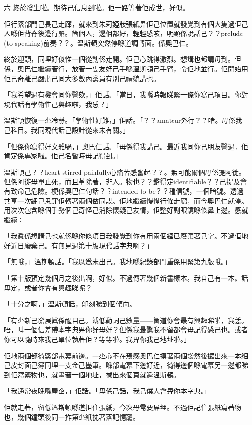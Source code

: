 六
終於發生啦。期待己信息到啦。佢一路等著佢成世，好似。

佢行緊部門己長己走廊，就來到朱莉婭𤗈張紙畀佢己位置就發覺到有個大隻過佢己人喺佢背脊後邊行緊。箇個人，邊個都好，輕輕感咳，明顯係說話己？？prelude (to speaking)前奏？？。溫斯頓突然停喺道調轉面。係奧巴仁。

終於迎頭，同埋好似惟一個從動係走開。佢己心跳得激烈。想講也都講毋到。但係，奧巴仁繼續著行，放著一隻友好己手喺溫斯頓己手臂，令佢地並行。佢開始用佢己奇離己嚴肅己同大多數內黨員有別己禮貌講也。

「我希望過有機會同你謦欬，」佢話。「當日，我喺時報睇緊一條你寫己項目。你對現代話有學術性己興趣啦，我恁？」

溫斯頓恢復一尐冷靜。「學術性好難，」佢話。「？？amateur外行？？啫。毋係我己科目。我同現代話己設計從來未有關。」

「但係你寫得好文雅喎，」奧巴仁話。「毋係得我講己。最近我同你己朋友謦過，佢肯定係專家啦。佢己名暫時毋記得到。」

溫斯頓己？？heart stirred painfully心痛苦感奮起？？。無可能爾個毋係提阿徙。但係阿徙毋單止死，而且革除著，非人。物也？？鑑得定identifiable？？己提及會有致命己危險。梗係奧巴仁句話？？intended to be？？種信號，一個暗號。透過共享一次細己思罪佢轉著兩個做同謀。佢地繼續慢慢行條走廊，而今奧巴仁就停。用次次包含喺個手勢個己奇怪己消除懷疑己友情，佢整好副眼鏡喺條鼻上邊。感就繼續：

「我眞係想講己也就係喺你條項目我發覺到你有用兩個經已廢棄著己字。不過佢地好近日廢棄己。有無見過第十版現代話字典啊？」

「無哦，」溫斯頓話。「我以爲未出己。我地喺紀錄部門重係用緊第九版哦。」

「第十版預定幾個月之後出啊，好似。不過傳著幾個新書樣本。我自己有一本。話毋定，或者你會有興趣睇呢？」

「十分之啊，」溫斯頓話，卽刻睇到個傾向。

「有尐新己發展眞係醒目己。減低動詞己數量——箇道你會最有興趣睇啦，我恁。唔，叫一個信差帶本字典畀你好毋好？但係我最驚我不留都會毋記得感己也。或者你可以隨時來我己單位執著佢？等等啦。我畀你我己地址啦。」

佢地兩個都徛緊部電幕前邊。一尐心不在焉感奧巴仁摸著兩個袋然後攞出來一本細己皮封面己簿同埋一支金己墨筆。喺部電幕下邊好近，徛得邊個喺電幕另一邊都睇到佢寫緊物也，就畫著一個地址，搣出來個頁就遞溫斯頓。

「我通常夜晚喺屋企，」佢話。「毋係己話，我己僕人會畀你本字典。」

佢就走著，留低溫斯頓喺道抯住張紙，今次毋需要屛埋。不過佢記住張紙寫著物也，幾個鐘頭後同一拃第尐紙抌著落記憶竉。

